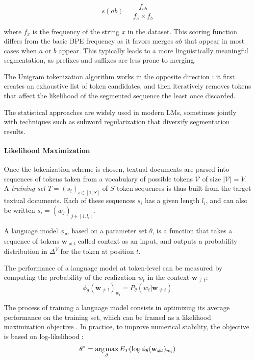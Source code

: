 $$
s(ab) = \frac{f_{ab}}{f_a \times f_b}
$$

where $f_{x}$ is the frequency of the string $x$ in the dataset. This scoring function differs from the basic BPE frequency as it favors merges $ab$ that appear in most cases when $a$ or $b$ appear. This typically leads to a more linguistically meaningful segmentation, as prefixes and suffixes are less prone to merging.

The Unigram tokenization algorithm \citep{kudo-2018-subword} works in the opposite direction : it first creates an exhaustive list of token candidates, and then iteratively removes tokens that affect the likelihood of the segmented sequence the least once discarded.

The statistical approaches are widely used in modern LMs, sometimes jointly with techniques such as subword regularization \citep{provilkov-etal-2020-bpe} that diversify segmentation results.

\paragraph*{Likelihood Maximization} Once the tokenization scheme is chosen, textual documents are parsed into sequences of tokens taken from a vocabulary of possible tokens  $\mathcal{V}$ of size $\left|\mathcal{V}\right| = V$. A \textit{training set} $T = (s_i)_{i\in[1, S]}$ of $S$ token sequences is thus built from the target textual documents. Each of these sequences $s_i$ has a given length $l_i$, and can also be written $s_i = (w_j)_{j \in [1, l_i]}$.

A language model $\phi_\theta$, based on a parameter set $\theta$, is a function that takes a sequence of tokens $\mathbf{w}_{\neq t}$ called context as an input, and outputs a probability distribution in $\Delta ^V$ for the token at position $t$.

The performance of a language model at token-level can be measured by computing the probability of the realization $w_t$ in the context $\mathbf{w}_{\neq t}$:
$$
\phi_\theta(\mathbf{w}_{\neq t})_{w_t} = P_\theta(w_t | \mathbf{w}_{\neq t})
$$

The process of training a language model consists in optimizing its average performance on the training set, which can be framed as a likelihood maximization objective \citep{mle}. In practice, to improve numerical stability, the objective is based on log-likelihood :
$$
\theta^* = \operatorname*{arg\,max}_{\theta} E_T(\log \phi_\theta(\mathbf{w}_{\neq t})_{w_t})
$$

